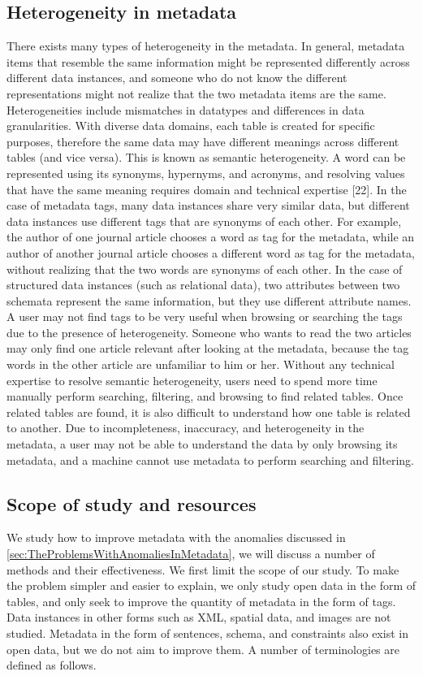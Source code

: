 \subsection{Heterogeneity in metadata}
There exists many types of heterogeneity in the metadata. In general, metadata items that resemble the same information might be represented differently across different data instances, and someone who do not know the different representations might not realize that the two metadata items are the same. Heterogeneities include mismatches in datatypes and differences in data granularities. With diverse data domains, each table is created for specific purposes, therefore the same data may have different meanings across different tables (and vice versa). This is known as semantic heterogeneity. A word can be represented using its synonyms, hypernyms, and acronyms, and resolving values that have the same meaning requires domain and technical expertise \cite{Halevy2005Why}[22].
In the case of metadata tags, many data instances share very similar data, but different data instances use different tags that are synonyms of each other. For example, the author of one journal article chooses a word as tag for the metadata, while an author of another journal article chooses a different word as tag for the metadata, without realizing that the two words are synonyms of each other. In the case of structured data instances (such as relational data), two attributes between two schemata represent the same information, but they use different attribute names.
A user may not find tags to be very useful when browsing or searching the tags due to the presence of heterogeneity. Someone who wants to read the two articles may only find one article relevant after looking at the metadata, because the tag words in the other article are unfamiliar to him or her. Without any technical expertise to resolve semantic heterogeneity, users need to
spend more time manually perform searching, filtering, and browsing to find related tables. Once related tables are found, it is also difficult to understand how one table is related to another.
Due to incompleteness, inaccuracy, and heterogeneity in the metadata, a user may not be able to understand the data by only browsing its metadata, and a machine cannot use metadata to perform searching and filtering.

\subsection{Scope of study and resources}
We study how to improve metadata with the anomalies discussed in \autoref{sec:TheProblemsWithAnomaliesInMetadata}, we will discuss a number of methods and their effectiveness. We first limit the scope of our study. To make the problem simpler and easier to explain, we only study open data in the form of tables, and only seek to improve the quantity of metadata in the form of tags. Data instances in other forms such as XML, spatial data, and images are not studied. Metadata in the form of sentences, schema, and constraints also exist in open data, but we do not aim to improve them. A number of terminologies are defined as follows.

